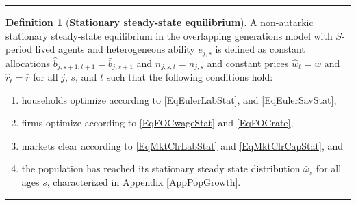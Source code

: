 \documentclass[letterpaper,12pt]{article}
\theoremstyle{definition}
\newtheorem{definition}{Definition} %
\begin{document}
    \hrule
    \begin{definition}[\textbf{Stationary steady-state equilibrium}]\label{DefEquilSS}
      A non-autarkic stationary steady-state equilibrium in the overlapping generations model with $S$-period lived agents and heterogeneous ability $e_{j,s}$ is defined as constant allocations $\hat{b}_{j,s+1,t+1}=\bar{b}_{j,s+1}$ and $\hat{n}_{j,s,t}=\bar{n}_{j,s}$ and constant prices $\hat{w}_t=\bar{w}$ and $\hat{r}_t=\bar{r}$ for all $j$, $s$, and $t$ such that the following conditions hold:
       \begin{enumerate}
          \item households optimize according to \eqref{EqEulerLabStat}, and \eqref{EqEulerSavStat},
          \item firms optimize according to \eqref{EqFOCwageStat} and \eqref{EqFOCrate},
          \item markets clear according to \eqref{EqMktClrLabStat} and \eqref{EqMktClrCapStat}, and
          \item the population has reached its stationary steady state distribution $\bar{\omega}_s$ for all ages $s$, characterized in Appendix \ref{AppPopGrowth}.
       \end{enumerate}
    \end{definition}
    \hrule
\end{document}
